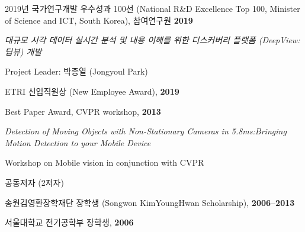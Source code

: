 \documentclass[10pt]{article}
\renewcommand{\section}[2]%
        {\pagebreak[2]\vspace{1.15\baselineskip}%
         \phantomsection\addcontentsline{toc}{section}{#1}%
         {\color{rulecol}\rule{\columnwidth}{0.5pt}}\par\vspace{0.40\baselineskip}%
         \hspace{0in}%
         \marginpar{\vspace{0.5pt}%
         \raggedright \sffamily\bfseries\footnotesize \color{accent} #1}#2}
\newenvironment{outerlist}[1][\enskip\textbullet]%
        {\begin{itemize}[#1]}{\end{itemize}%
         \vspace{-.6\baselineskip}}
\newenvironment{innerlist}[1][\enskip\textbullet]%
        {\begin{compactitem}[#1]}{\end{compactitem}}
\begin{document}
2019년 국가연구개발 우수성과 100선  (National R\&D Excellence Top 100, Minister of Science and ICT, South Korea), 참여연구원 \hfill \textbf{2019}
\begin{outerlist}
\item[] \textit{대규모 시각 데이터 실시간 분석 및 내용 이해를 위한 디스커버리 플랫폼 (DeepView:딥뷰) 개발}%
    \begin{innerlist}
	    \item Project Leader: 박종열 (Jongyoul Park)
	\end{innerlist}
\end{outerlist}
\vspace{0.5cm}

ETRI 신입직원상 (New Employee Award), \hfill \textbf{2019}
\vspace{0.5cm}

Best Paper Award, CVPR workshop, \hfill \textbf{2013}
\begin{outerlist}
\item[] \textit{Detection of Moving Objects with Non-Stationary Cameras in 5.8ms:Bringing Motion Detection to your Mobile Device}%
    \begin{innerlist}
	    \item Workshop on Mobile vision in conjunction with CVPR
	    \item 공동저자 (2저자)
	\end{innerlist}
\end{outerlist}
\vspace{0.5cm}

송원김영환장학재단 장학생 (Songwon KimYoungHwan Scholarship), \hfill \textbf{2006--2013}
\vspace{0.5cm}
		
	
서울대학교 전기공학부 장학생, \hfill \textbf{2006}


\end{document}
